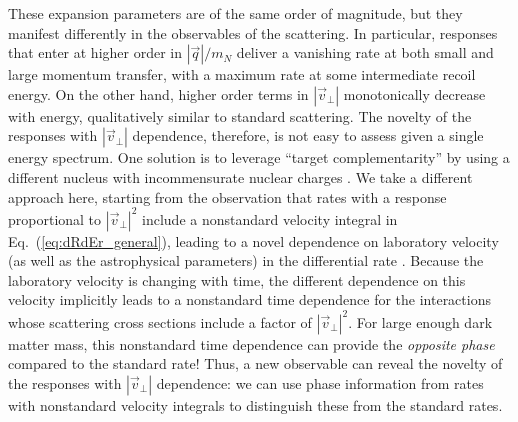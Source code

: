 \documentclass[11pt]{article}
\newcommand{\Eq}[1]{Eq.~(\ref{#1})} \newcommand{\Eqs}[2]{Eqs.~(\ref{#1}) and (\ref{#2})} \newcommand{\Eqm}[2]{Eqs.~(\ref{#1}) through (\ref{#2})}
\begin{document}
These expansion parameters are of the same order of magnitude, but they manifest differently in the observables of the scattering. In particular, responses that enter at higher order in $|\vec q|/m_N$ deliver a vanishing rate at both small and large momentum transfer, with a maximum rate at some intermediate recoil energy. On the other hand, higher order terms in $| \vec v_\perp|$ monotonically decrease with energy, qualitatively similar to standard scattering. The novelty of the responses with $| \vec v_\perp|$ dependence, therefore, is not easy to assess given a single energy spectrum. One solution is to leverage ``target complementarity'' by using a different nucleus with incommensurate nuclear charges \cite{Gluscevic:2015sqa}. We take a different approach here, starting from the observation that rates with a response proportional to $| \vec v_\perp|^2$ include a nonstandard velocity integral in \Eq{eq:dRdEr_general}, leading to a novel dependence on laboratory velocity (as well as the astrophysical parameters) in the differential rate \cite{Fitzpatrick:2010br}. Because the laboratory velocity is changing with time, the different dependence on this velocity implicitly leads to a nonstandard time dependence for the interactions whose scattering cross sections include a factor of $|\vec v_\perp|^2$. For large enough dark matter mass, this nonstandard time dependence can provide the {\it opposite phase} compared to the standard rate! Thus, a new observable can reveal the novelty of the responses with $|\vec v_\perp|$ dependence: we can use phase information from rates with nonstandard velocity integrals to distinguish these from the standard rates.

\end{document}
